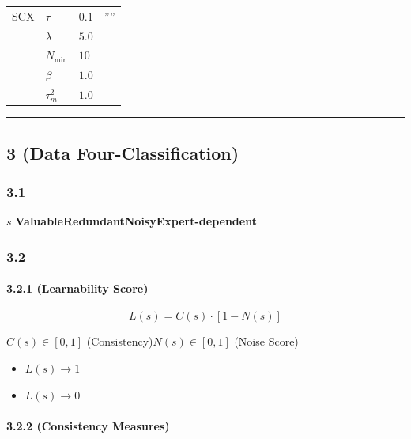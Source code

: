 \documentclass[
  12pt,
]{article}
\providecommand{\tightlist}{%
  \setlength{\itemsep}{0pt}\setlength{\parskip}{0pt}}
\begin{document}
\begin{longtable}[]{@{}llll@{}}
\toprule\noalign{}
 &  &  &  \\
\midrule\noalign{}
\endhead
\bottomrule\noalign{}
\endlastfoot
SCX  & \(\tau\) & \(0.1\) & '''' \\
 & \(\lambda\) & \(5.0\) &  \\
 & \(N_{\min}\) & \(10\) &  \\
 & \(\beta\) & \(1.0\) &  \\
 & \(\tau_m^2\) & \(1.0\) &  \\
\end{longtable}

\begin{center}\rule{0.5\linewidth}{0.5pt}\end{center}

\subsection{ 3 (Data
Four-Classification)}\label{ux6a21ux5757-3ux6570ux636eux56dbux5206ux7c7b-data-four-classification}

\subsubsection{3.1 }\label{ux95eeux9898ux8bbeux5b9a-2}

 \(s\)
\textbf{}\textbf{Valuable}\textbf{Redundant}\textbf{Noisy}\textbf{Expert-dependent}

\subsubsection{3.2 }\label{ux6570ux5b66ux6a21ux578b-2}

\paragraph{3.2.1  (Learnability
Score)}\label{ux53efux5b66ux4e60ux6027ux5206ux6570-learnability-score}

\[
L(s) = C(s) \cdot [1 - N(s)]
\]

 \(C(s) \in [0,1]\)  (Consistency)\(N(s) \in [0,1]\)
 (Noise Score)

\begin{itemize}
\tightlist
\item
  \(L(s) \to 1\)
\item
  \(L(s) \to 0\)
\end{itemize}

\paragraph{3.2.2  (Consistency
Measures)}\label{ux4e00ux81f4ux6027ux5ea6ux91cf-consistency-measures}
\end{document}
